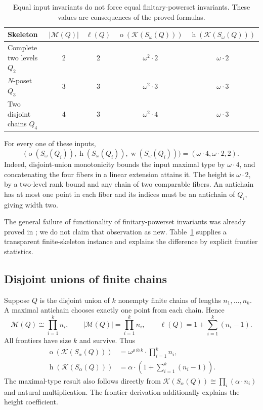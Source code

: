 \documentclass[11pt,a4paper]{article}
\theoremstyle{definition}
\theoremstyle{remark}
\newcommand{\K}{\mathcal K}
\newcommand{\M}{\mathcal M}
\newcommand{\ot}{\operatorname{o}}
\newcommand{\hgt}{\operatorname{h}}
\newcommand{\wid}{\operatorname{w}}
\newcommand{\np}{\mathbin{\otimes}}
\begin{document}
\begin{table}[htbp]
\centering
\renewcommand{\arraystretch}{1.22}
\begin{tabular}{@{}lcccc@{}}
\toprule
Skeleton & $|\M(Q)|$ & $\ell(Q)$ & $\ot(\K(S_\omega(Q)))$
 & $\hgt(\K(S_\omega(Q)))$\\
\midrule
Complete two levels $Q_2$ & 2 & 2 & $\omega^2\cdot2$ & $\omega\cdot2$\\
$N$-poset $Q_3$ & 3 & 3 & $\omega^2\cdot3$ & $\omega\cdot3$\\
Two disjoint chains $Q_4$ & 4 & 3 & $\omega^2\cdot4$ & $\omega\cdot3$\\
\bottomrule
\end{tabular}
\caption{Equal input invariants do not force equal finitary-powerset
invariants. These values are consequences of the proved formulas.}
\label{tab:three}
\end{table}

For every one of these inputs,
\begin{equation}\label{eq:equalinputs}
 \bigl(\ot(S_\omega(Q_i)),\hgt(S_\omega(Q_i)),\wid(S_\omega(Q_i))\bigr)
      =(\omega\cdot4,\omega\cdot2,2).
\end{equation}
Indeed, disjoint-union monotonicity bounds the input maximal type by
$\omega\cdot4$, and concatenating the four fibers in a linear extension
attains it. The height is $\omega\cdot2$, by a two-level rank bound and
any chain of two comparable fibers. An antichain has at most one point in
each fiber and its indices must be an antichain of $Q_i$, giving width two.

The general failure of functionality of finitary-powerset invariants was
already proved in \cite{AbriolaEtAl2024}; we do not claim that observation
as new. Table~\ref{tab:three} supplies a transparent finite-skeleton
instance and explains the difference by explicit frontier statistics.

\subsection{Disjoint unions of finite chains}

Suppose $Q$ is the disjoint union of $k$ nonempty finite chains of lengths
$n_1,\ldots,n_k$. A maximal antichain chooses exactly one point from each
chain. Hence
\[
 \M(Q)\cong\prod_{i=1}^k n_i,
 \qquad |\M(Q)|=\prod_{i=1}^k n_i,
 \qquad \ell(Q)=1+\sum_{i=1}^k(n_i-1).
\]
All frontiers have size $k$ and survive. Thus
\begin{align*}
 \ot(\K(S_\alpha(Q)))
   &=\omega^{\rho\np k}\cdot\prod_{i=1}^k n_i,\\
 \hgt(\K(S_\alpha(Q)))
   &=\alpha\cdot\left(1+\sum_{i=1}^k(n_i-1)\right).
\end{align*}
The maximal-type result also follows directly from
$\K(S_\alpha(Q))\cong\prod_i(\alpha\cdot n_i)$ and natural multiplication.
The frontier derivation additionally explains the height coefficient.
\end{document}
